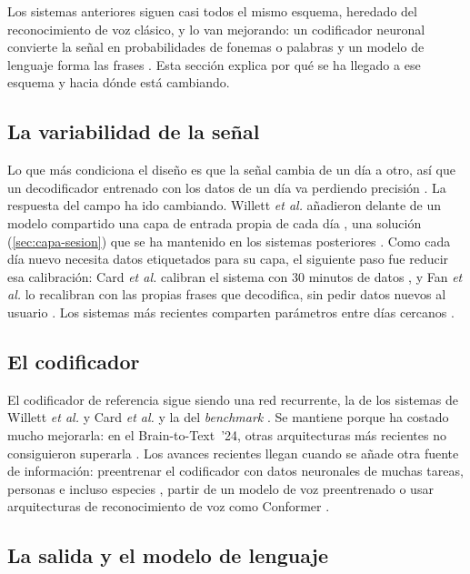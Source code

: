 Los sistemas anteriores siguen casi todos el mismo esquema, heredado del reconocimiento de voz clásico, y lo van mejorando: un codificador neuronal convierte la señal en probabilidades de fonemas o palabras y un modelo de lenguaje forma las frases \cite{crossspecies2025}. Esta sección explica por qué se ha llegado a ese esquema y hacia dónde está cambiando.

\subsection{La variabilidad de la señal}

Lo que más condiciona el diseño es que la señal cambia de un día a otro, así que un decodificador entrenado con los datos de un día va perdiendo precisión \cite{sussillo2016}. La respuesta del campo ha ido cambiando. Willett \textit{et al.} añadieron delante de un modelo compartido una capa de entrada propia de cada día \cite{willett2021}, una solución (\cref{sec:capa-sesion}) que se ha mantenido en los sistemas posteriores \cite{willett2023,card2024}. Como cada día nuevo necesita datos etiquetados para su capa, el siguiente paso fue reducir esa calibración: Card \textit{et al.} calibran el sistema con 30 minutos de datos \cite{card2024}, y Fan \textit{et al.} lo recalibran con las propias frases que decodifica, sin pedir datos nuevos al usuario \cite{fan2023corp}. Los sistemas más recientes comparten parámetros entre días cercanos \cite{brainwhisperer}.

\subsection{El codificador}

El codificador de referencia sigue siendo una red recurrente, la de los sistemas de Willett \textit{et al.} y Card \textit{et al.} y la del \textit{benchmark} \cite{willett2023,card2024,b2t25}. Se mantiene porque ha costado mucho mejorarla: en el Brain-to-Text~'24, otras arquitecturas más recientes no consiguieron superarla \cite{b2t24lessons}. Los avances recientes llegan cuando se añade otra fuente de información: preentrenar el codificador con datos neuronales de muchas tareas, personas e incluso especies \cite{crossspecies2025}, partir de un modelo de voz preentrenado \cite{brainwhisperer} o usar arquitecturas de reconocimiento de voz como Conformer \cite{khanday2026}.

\subsection{La salida y el modelo de lenguaje}

